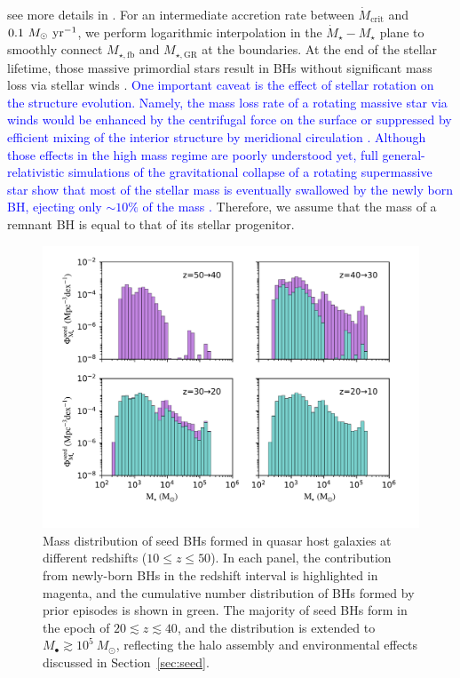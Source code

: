 \documentclass[twocolumn, twocolappendix]{aastex63}
\newcommand{\Msun}{M_\odot}
\newcommand{\Msunyr}{M_\odot~{\rm yr}^{-1}}
\newcommand{\Mdot}{\dot{M}}
\newcommand{\blue}[1]{\textcolor{blue}{ #1}}
\begin{document}
\begin{CJK*}{UTF8}{gbsn}
\begin{equation}
\end{equation}
%
see more details in \cite{2021ApJ...917...60L}.
For an intermediate accretion rate between $\Mdot_\mathrm{crit}$ and $0.1~\Msunyr$, 
we perform logarithmic interpolation in the $\Mdot_\star - M_\star$ plane to smoothly connect 
$M_{\star, \mathrm{fb}}$ and $M_{\star, \mathrm{GR}}$ at the boundaries.
At the end of the stellar lifetime, those massive primordial stars result in BHs without significant mass loss 
via stellar winds \citep{2003ApJ...591..288H,2015MNRAS.451.4086S}.
\blue{One important caveat is the effect of stellar rotation on the structure evolution.
Namely, the mass loss rate of a rotating massive star via winds would be enhanced by the centrifugal force on the surface
or suppressed by efficient mixing of the interior structure by meridional circulation \citep[see][references therein]{2008A&A...489..685E,2012A&A...542A.113Y}.
Although those effects in the high mass regime are poorly understood yet, full general-relativistic simulations of the gravitational collapse of a rotating supermassive star 
show that most of the stellar mass is eventually swallowed by the newly born BH, ejecting only $\sim 10\%$ of the mass \citep{2002ApJ...572L..39S,2016PhRvD..94b1501S}.}
Therefore, we assume that the mass of a remnant BH is equal to that of its stellar progenitor.


\begin{figure}
\centering
\includegraphics[width=140mm]{seedBHMF_z.pdf}
\caption{
Mass distribution of seed BHs formed in quasar host galaxies at different redshifts ($10\leq z \leq 50$).
In each panel, the contribution from newly-born BHs in the redshift interval is highlighted in magenta,
and the cumulative number distribution of BHs formed by prior episodes is shown in green.
The majority of seed BHs form in the epoch of $20\lesssim z \lesssim 40$,
and the distribution is extended to $M_\bullet \gtrsim 10^5~\Msun$, 
reflecting the halo assembly and environmental effects discussed in Section~\ref{sec:seed}.
}
\label{fig:seedmf}
\vspace{5mm}
\end{figure}



\end{CJK*}
\end{document}
